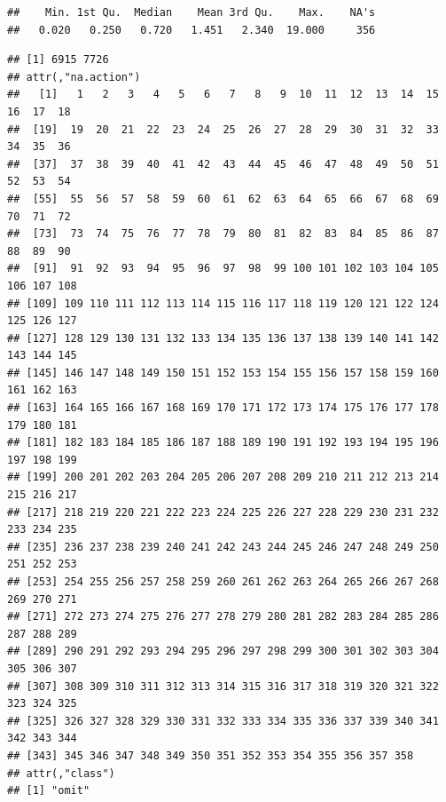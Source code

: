 \documentclass[
  10pt,
  b5paper,
  oneside]{book}
\newenvironment{Shaded}{\begin{snugshade}}{\end{snugshade}}
\newcommand{\DecValTok}[1]{\textcolor[rgb]{0.00,0.00,0.81}{#1}}
\newcommand{\FunctionTok}[1]{\textcolor[rgb]{0.00,0.00,0.00}{#1}}
\newcommand{\NormalTok}[1]{#1}
\newcommand{\SpecialCharTok}[1]{\textcolor[rgb]{0.00,0.00,0.00}{#1}}
\begin{document}
\begin{verbatim}
##    Min. 1st Qu.  Median    Mean 3rd Qu.    Max.    NA's 
##   0.020   0.250   0.720   1.451   2.340  19.000     356
\end{verbatim}

\begin{Shaded}
\end{Shaded}

\begin{verbatim}
## [1] 6915 7726
## attr(,"na.action")
##   [1]   1   2   3   4   5   6   7   8   9  10  11  12  13  14  15  16  17  18
##  [19]  19  20  21  22  23  24  25  26  27  28  29  30  31  32  33  34  35  36
##  [37]  37  38  39  40  41  42  43  44  45  46  47  48  49  50  51  52  53  54
##  [55]  55  56  57  58  59  60  61  62  63  64  65  66  67  68  69  70  71  72
##  [73]  73  74  75  76  77  78  79  80  81  82  83  84  85  86  87  88  89  90
##  [91]  91  92  93  94  95  96  97  98  99 100 101 102 103 104 105 106 107 108
## [109] 109 110 111 112 113 114 115 116 117 118 119 120 121 122 124 125 126 127
## [127] 128 129 130 131 132 133 134 135 136 137 138 139 140 141 142 143 144 145
## [145] 146 147 148 149 150 151 152 153 154 155 156 157 158 159 160 161 162 163
## [163] 164 165 166 167 168 169 170 171 172 173 174 175 176 177 178 179 180 181
## [181] 182 183 184 185 186 187 188 189 190 191 192 193 194 195 196 197 198 199
## [199] 200 201 202 203 204 205 206 207 208 209 210 211 212 213 214 215 216 217
## [217] 218 219 220 221 222 223 224 225 226 227 228 229 230 231 232 233 234 235
## [235] 236 237 238 239 240 241 242 243 244 245 246 247 248 249 250 251 252 253
## [253] 254 255 256 257 258 259 260 261 262 263 264 265 266 267 268 269 270 271
## [271] 272 273 274 275 276 277 278 279 280 281 282 283 284 285 286 287 288 289
## [289] 290 291 292 293 294 295 296 297 298 299 300 301 302 303 304 305 306 307
## [307] 308 309 310 311 312 313 314 315 316 317 318 319 320 321 322 323 324 325
## [325] 326 327 328 329 330 331 332 333 334 335 336 337 339 340 341 342 343 344
## [343] 345 346 347 348 349 350 351 352 353 354 355 356 357 358
## attr(,"class")
## [1] "omit"
\end{verbatim}

\begin{Shaded}
\end{Shaded}
\end{document}
